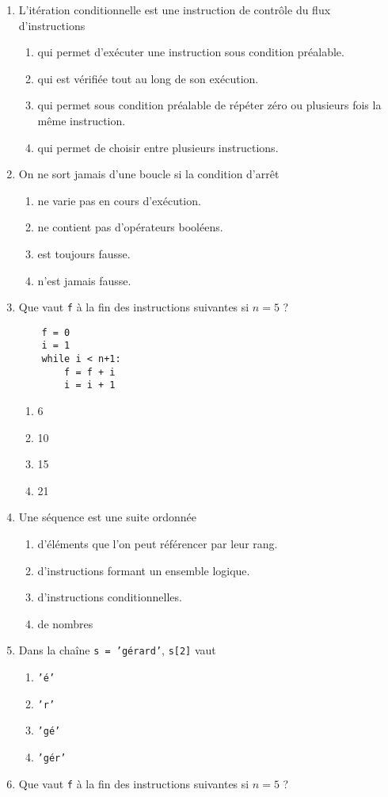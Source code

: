 \begin{td}[QCM (2)]
\begin{enumerate}
\item L'itération conditionnelle est une instruction de contrôle du flux d'instructions 
	\begin{enumerate}
	\item qui permet d'exécuter une instruction sous condition préalable.
	\item qui est vérifiée tout au long de son exécution. 
	\item qui permet sous condition préalable de répéter zéro ou plusieurs fois la même instruction.
	\item qui permet de choisir entre plusieurs instructions.
	\end{enumerate}
\item On ne sort jamais d'une boucle si la condition d'arrêt 
	\begin{enumerate}
	\item ne varie pas en cours d'exécution.
	\item ne contient pas d'opérateurs booléens.
	\item est toujours fausse.
	\item n'est jamais fausse.
	\end{enumerate}
\item Que vaut {\tt f} à la fin des instructions suivantes si $n = 5$ ?

	\begin{py}{4cm}
	\begin{verbatim}
	f = 0
	i = 1
	while i < n+1:
	    f = f + i
	    i = i + 1
	\end{verbatim}
	\end{py}

	\begin{enumerate}
	\item 6
	\item 10
	\item 15
	\item 21
	\end{enumerate}
\item Une séquence est une suite ordonnée 
	\begin{enumerate}
	\item d'éléments que l'on peut référencer par leur rang.
	\item d'instructions formant un ensemble logique.
	\item d'instructions conditionnelles.
	\item de nombres
	\end{enumerate}
\item Dans la chaîne {\tt s = 'gérard'}, {\tt s[2]} vaut
	\begin{enumerate}
	\item {\tt 'é'}
	\item {\tt 'r'}
	\item {\tt 'gé'}
	\item {\tt 'gér'}
	\end{enumerate}
\item Que vaut {\tt f} à la fin des instructions suivantes si $n = 5$ ?


\end{enumerate}
\end{td}
